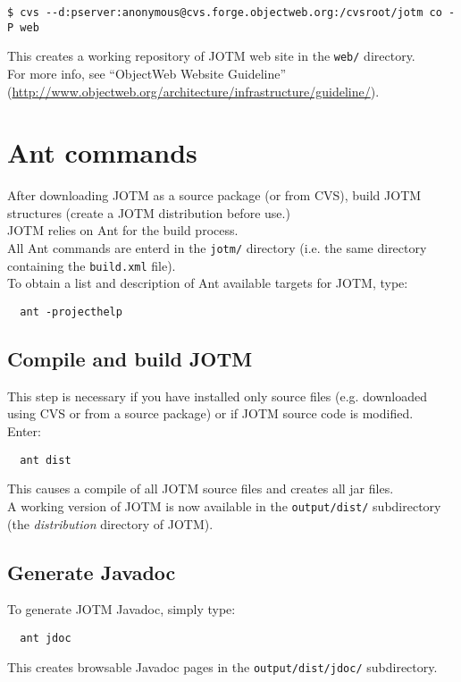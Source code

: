 \documentclass[a4paper,11pt]{article}
\begin{document}
\begin{verbatim}
$ cvs --d:pserver:anonymous@cvs.forge.objectweb.org:/cvsroot/jotm co -P web
\end{verbatim}
This creates a working repository of JOTM web site in the
\texttt{web/} directory.\\
For more info, see ``ObjectWeb Website Guideline''
(\url{http://www.objectweb.org/architecture/infrastructure/guideline/}).


\section{Ant commands}
\label{sec:ant_cmds}
After downloading JOTM as a source package (or from CVS), 
build JOTM structures (create a JOTM distribution before use.)\\
JOTM relies on Ant for the build process.\\
All Ant commands are enterd in the \texttt{jotm/} directory
(i.e. the same directory containing the \texttt{build.xml} file).\\
To obtain a list and description of Ant available targets for JOTM,
type:
\begin{verbatim}
  ant -projecthelp
\end{verbatim}

\subsection{Compile and build JOTM}
\label{sec:build_cmd}
This step is necessary if you have installed only source files 
(e.g. downloaded using CVS or from a source package) or if JOTM source code is 
 modified.\\
Enter:
\begin{verbatim}
  ant dist
\end{verbatim}
This causes a compile of all JOTM source files and creates all jar files.\\
A working version of JOTM is now available in the
\texttt{output/dist/} subdirectory (the \emph{distribution} directory
of JOTM).

\subsection{Generate Javadoc}
\label{sec:jdoc_cmd}
To generate JOTM Javadoc, simply type:
\begin{verbatim}
  ant jdoc
\end{verbatim}
This creates browsable Javadoc pages in the \texttt{output/dist/jdoc/}
 subdirectory.
\end{document}
